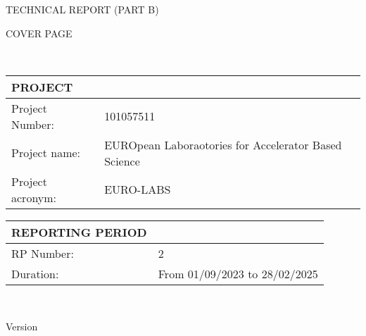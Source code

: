%
%


\vspace*{-0.05cm}

{\fontsize{12}{15}\bf\color{mycayenne}
        \centerline{TECHNICAL REPORT (PART B)}
        
        COVER PAGE}\\%
  \setlength{\parindent}{0pt}
  
  \def\arraystretch{1.25}
  {\fontsize{9}{11}\selectfont
  \begin{tabular}[t]{!{\color{mygray}\vrule}p{.25\linewidth}!{\color{mygray}\vrule}p{.6885\linewidth}!{\color{mygray}\vrule}} \hline
    {\rule{0pt}{2.5ex}\color{myblack}\bf PROJECT} \\ \hline
    Project Number: & 101057511 \\ \hline
    Project name: & EUROpean Laboraotories for Accelerator Based Science \\ \hline
    Project acronym: & EURO-LABS \\
    \hline
  \end{tabular}

  \vspace*{1cm}
  
  \begin{tabular}[t]{!{\color{mygray}\vrule}p{.25\linewidth}!{\color{mygray}\vrule}p{.6885\linewidth}!{\color{mygray}\vrule}} \hline
    {\rule{0pt}{2.5ex}\color{myblack}\bf REPORTING PERIOD} \\ \hline
    RP Number: & 2 \\ \hline
    Duration: & From 01/09/2023 to 28/02/2025 \\ \hline
  \end{tabular}
}\\[3ex]

\begin{center}
    \vspace*{2cm}
    
    Version \docversion
  
    \vspace*{0.5cm}
    \docdate

    \vspace*{1.5cm}
    
\end{center}
\clearpage
\restoregeometry